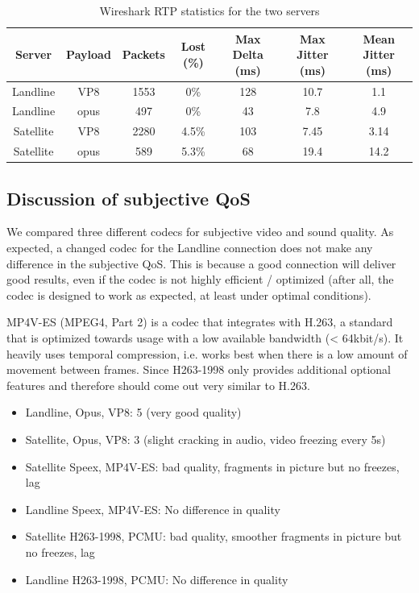 \documentclass[parskip=full]{scrartcl}
\begin{document}
\begin{table}
    \centering
    \begin{tabular}{c c c c c c c}
       \hline
       Server & Payload & Packets & Lost (\%) & Max Delta (ms) & Max Jitter (ms) & Mean Jitter (ms)\\
       \hline
       Landline & VP8 & 1553 & 0\% & 128 & 10.7 & 1.1 \\
       Landline & opus & 497 & 0\% & 43 & 7.8 & 4.9 \\
       Satellite & VP8 & 2280 & 4.5\% & 103 & 7.45 & 3.14\\
       Satellite & opus & 589 & 5.3\% & 68 & 19.4 & 14.2\\
       \hline
    \end{tabular}
    \caption{Wireshark RTP statistics for the two servers}
    \label{tbl:rtpStatistics}
\end{table}


\subsection{Discussion of subjective QoS}
We compared three different codecs for subjective video and sound quality.
As expected, a changed codec for the Landline connection does not make any difference in the subjective QoS.
This is because a good connection will deliver good results, even if the codec is not highly efficient / optimized (after all, the codec is designed to work as expected, at least under optimal conditions).

MP4V-ES (MPEG4, Part 2) is a codec that integrates with H.263, a standard that is optimized towards usage with a low available bandwidth (< 64kbit/s).
It heavily uses temporal compression, i.e. works best when there is a low amount of movement between frames.
Since H263-1998 only provides additional optional features and therefore should come out very similar to H.263.

\begin{itemize}
	\item Landline, Opus, VP8: 5 (very good quality)
	\item Satellite, Opus, VP8: 3 (slight cracking in audio, video freezing every 5s)
	\item Satellite Speex, MP4V-ES: bad quality, fragments in picture but no freezes, lag
	\item Landline Speex, MP4V-ES: No difference in quality
	\item Satellite H263-1998, PCMU: bad quality, smoother fragments in picture but no freezes, lag
	\item Landline H263-1998, PCMU: No difference in quality
\end{itemize}




\end{document}
